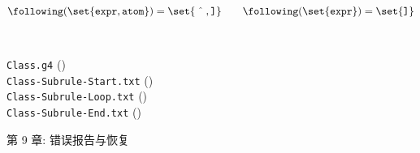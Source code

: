 \begin{frame}{}
  \[
    \following(\set{\texttt{expr}, \texttt{atom}}) = \set{\hat{\quad}, \texttt{]}} \qquad
    \following(\set{\texttt{expr}}) = \set{\texttt{]}}
  \]
  \begin{columns}
  \end{columns}

  \pause
  \vspace{0.60cm}
  \begin{center}
  \end{center}
\end{frame}

\begin{frame}{}
  \begin{center}
     \\[20pt]

    \texttt{Class.g4} (\texttt{}) \\[20pt]
    \texttt{Class-Subrule-Start.txt} () \\[10pt]
    \texttt{Class-Subrule-Loop.txt} () \\[10pt]
    \texttt{Class-Subrule-End.txt} ()
  \end{center}
\end{frame}

\begin{frame}{}

  \begin{center}
    第 9 章: 错误报告与恢复
  \end{center}
\end{frame}

